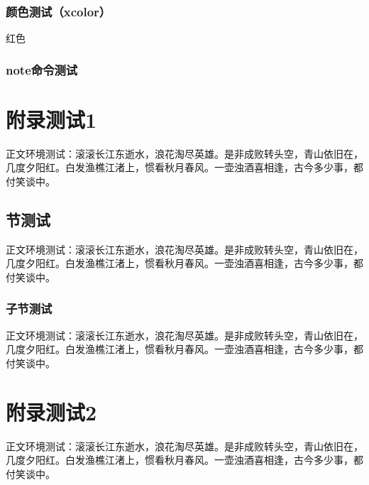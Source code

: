 \documentclass{../../PublicResources/DocClassLight}
\begin{document}
    \subsection{颜色测试（xcolor）}
     { 红色}


    \subsection{note命令测试}




    \appendix
    \chapter{附录测试1}
    正文环境测试：滚滚长江东逝水，浪花淘尽英雄。是非成败转头空，青山依旧在，几度夕阳红。白发渔樵江渚上，惯看秋月春风。一壶浊酒喜相逢，古今多少事，都付笑谈中。
    \section{节测试}
    正文环境测试：滚滚长江东逝水，浪花淘尽英雄。是非成败转头空，青山依旧在，几度夕阳红。白发渔樵江渚上，惯看秋月春风。一壶浊酒喜相逢，古今多少事，都付笑谈中。
    \subsection{子节测试}
    正文环境测试：滚滚长江东逝水，浪花淘尽英雄。是非成败转头空，青山依旧在，几度夕阳红。白发渔樵江渚上，惯看秋月春风。一壶浊酒喜相逢，古今多少事，都付笑谈中。
    \chapter{附录测试2}
    正文环境测试：滚滚长江东逝水，浪花淘尽英雄。是非成败转头空，青山依旧在，几度夕阳红。白发渔樵江渚上，惯看秋月春风。一壶浊酒喜相逢，古今多少事，都付笑谈中。
\end{document}
